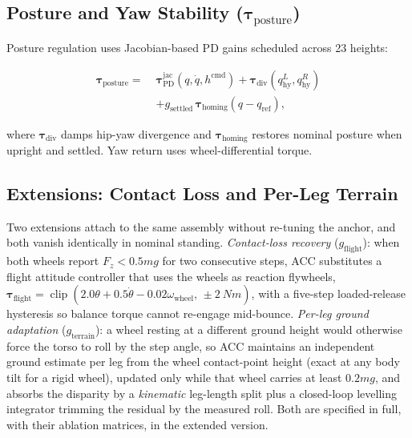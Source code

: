 \documentclass{jcd}
\begin{document}
\subsection{Posture and Yaw Stability ($\boldsymbol{\tau}_{\text{posture}}$)}
\label{sec:posture}

Posture regulation uses Jacobian-based PD gains scheduled across \num{23}
heights:

\begin{equation}
\begin{split}
\boldsymbol{\tau}_{\text{posture}} =\;&
\boldsymbol{\tau}_{\text{PD}}^{\text{jac}}(q,\dot{q},h^{\text{cmd}})
+ \boldsymbol{\tau}_{\text{div}}(q_{\text{hy}}^L,q_{\text{hy}}^R)\\
&+ g_{\text{settled}}\,\boldsymbol{\tau}_{\text{homing}}(q-q_{\text{ref}}),
\end{split}
\label{eq:posture}
\end{equation}

where $\boldsymbol{\tau}_{\text{div}}$ damps hip-yaw divergence and
$\boldsymbol{\tau}_{\text{homing}}$ restores nominal posture when upright and
settled. Yaw return uses wheel-differential torque.

\subsection{Extensions: Contact Loss and Per-Leg Terrain}
\label{sec:extensions}

Two extensions attach to the same assembly without re-tuning the anchor, and
both vanish identically in nominal standing. \emph{Contact-loss recovery}
($g_{\text{flight}}$): when both wheels report $F_z < 0.5mg$ for two consecutive
steps, ACC substitutes a flight attitude controller that uses the wheels as
reaction flywheels, $\boldsymbol{\tau}_{\text{flight}} =
\operatorname{clip}(2.0\theta + 0.5\dot{\theta} -
0.02\omega_{\text{wheel}},\,\pm\SI{2}{Nm})$, with a five-step loaded-release
hysteresis so balance torque cannot re-engage mid-bounce. \emph{Per-leg ground
adaptation} ($g_{\text{terrain}}$): a wheel resting at a different ground height
would otherwise force the torso to roll by the step angle, so ACC maintains an
independent ground estimate per leg from the wheel contact-point height (exact at any body tilt for a rigid wheel), updated only while that wheel carries at
least $0.2mg$, and absorbs the disparity by a \emph{kinematic} leg-length split
plus a closed-loop levelling integrator trimming the residual by the measured
roll. Both are specified in full, with their ablation matrices, in the extended
version.
\end{document}
